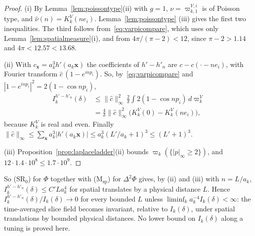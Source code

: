 \documentclass[aps,prd,twocolumn,superscriptaddress,nofootinbib,longbibliography,floatfix,amsmath,amssymb,10pt]{revtex4-2}
\theoremstyle{definition}
\theoremstyle{remark}
\begin{document}
\begin{proof}
(i) By Lemma~\ref{lem:poissontype}(ii) with $g=1$, $\nu=\varpi^{V,i}_{k,1}$
is of Poisson type, and $\hat\nu(n)=K^V_k(ne_i)$. Lemma~\ref{lem:poissontype}
(iii) gives the first two inequalities. The third follows from~\eqref{eq:varpicompare}, which uses only
Lemma~\ref{lem:spatialmeasure}(i), and from $4\pi/(\pi-2)<12$, since
$\pi-2>1.14$ and $4\pi<12.57<13.68$.

(ii) With $c_{\mathbf x}=a_k^3h'(a_k\mathbf x)$ the coefficients of
$h'-h'_n$ are $c-c(\cdot-ne_i)$, with Fourier transform $\hat c\,(1-
e^{inp_i})$. So, by~\eqref{eq:varpicompare} and
$|1-e^{inp_i}|^2=2(1-\cos np_i)$,
\[
\begin{split}
I^{h'-h'_n}_k(\delta)&\le\|\hat c\|_\infty^2\,\frac2\delta\int2(1-\cos
np_i)\,d\varpi^V_k\\
&=\frac4\delta\|\hat c\|_\infty^2\bigl(K^V_k(0)-K^V_k(ne_i)\bigr),
\end{split}
\]
because $K^V_k$ is real and even. Finally $\|\hat c\|_\infty\le\sum_{\mathbf
x}a_k^3|h'(a_k\mathbf x)|\le a_k^3(L'/a_k+1)^3\le(L'+1)^3$.

(iii) Proposition~\ref{prop:laplaceladder}(ii) bounds
$\varpi_k(\{|p|_\infty\ge2\})$, and $12\cdot1.4\cdot10^8\le1.7\cdot10^9$.
\end{proof}

So (SR$_0$) for $\Phi$ together with (M$_{\mathrm{sp}}$) for
$\Delta^2\Phi$ gives, by (ii) and (iii) with $n=L/a_k$, $I^{h'-h'_n}_k(
\delta)\le C'La_k^4$ for spatial translates by a physical distance $L$.
Hence $I^{h'-h'_n}_k(\delta)/I_k(\delta)\to0$ for every bounded $L$
unless $\liminf_ka_k^{-4}I_k(\delta)<\infty$: the time-averaged slice field
becomes invariant, relative to $I_k(\delta)$, under spatial translations by
bounded physical distances. No lower bound on $I_k(\delta)$ along a tuning
is proved here.
\end{document}

